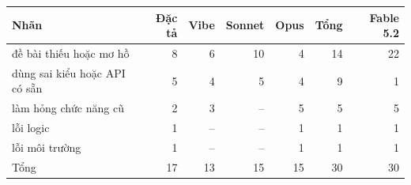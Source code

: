 \begin{tabular}{lrrrrrr}
\toprule
Nhãn & Đặc tả & Vibe & Sonnet & Opus & Tổng & Fable 5.2 \\
\midrule
đề bài thiếu hoặc mơ hồ & 8 & 6 & 10 & 4 & 14 & 22 \\
dùng sai kiểu hoặc API có sẵn & 5 & 4 & 5 & 4 & 9 & 1 \\
làm hỏng chức năng cũ & 2 & 3 & -- & 5 & 5 & 5 \\
lỗi logic & 1 & -- & -- & 1 & 1 & 1 \\
lỗi môi trường & 1 & -- & -- & 1 & 1 & 1 \\
\midrule
Tổng & 17 & 13 & 15 & 15 & 30 & 30 \\
\bottomrule
\end{tabular}
